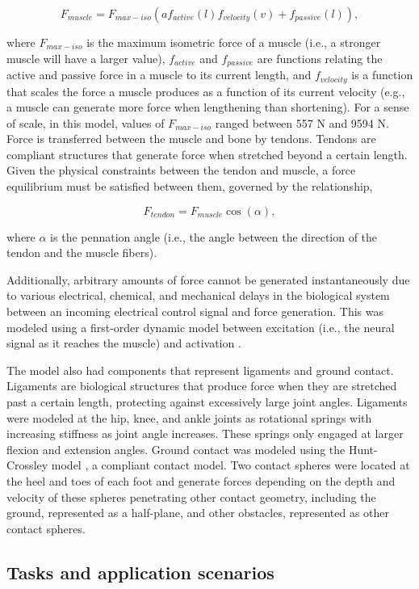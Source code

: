 \documentclass[graybox]{svmult}
\begin{document}
\[F_{muscle} = F_{max-iso}(af_{active}(l)f_{velocity}(v) + f_{passive}(l)),\]

where $F_{max-iso}$ is the maximum isometric force of a muscle (i.e., a stronger muscle will have a larger value), $f_{active}$ and $f_{passive}$ are functions relating the active and passive force in a muscle to its current length, and $f_{velocity}$ is a function that scales the force a muscle produces as a function of its current velocity (e.g., a muscle can generate more force when lengthening than shortening). For a sense of scale, in this model, values of $F_{max-iso}$ ranged between 557 N and 9594 N. Force is transferred between the muscle and bone by tendons. Tendons are compliant structures that generate force when stretched beyond a certain length. Given the physical constraints between the tendon and muscle, a force equilibrium must be satisfied between them, governed by the relationship,

\[F_{tendon} = F_{muscle}\cos(\alpha),\]

where $\alpha$ is the pennation angle (i.e., the angle between the direction of the tendon and the muscle fibers).

Additionally, arbitrary amounts of force cannot be generated instantaneously due to various electrical, chemical, and mechanical delays in the biological system between an incoming electrical control signal and force generation. This was modeled using a first-order dynamic model between excitation (i.e., the neural signal as it reaches the muscle) and activation \cite{thelen2003muscle}.

The model also had components that represent ligaments and ground contact. Ligaments are biological structures that produce force when they are stretched past a certain length, protecting against excessively large joint angles. Ligaments were modeled at the hip, knee, and ankle joints as rotational springs with increasing stiffness as joint angle increases. These springs only engaged at larger flexion and extension angles. Ground contact was modeled using the Hunt-Crossley model \cite{hunt1975contact}, a compliant contact model. Two contact spheres were located at the heel and toes of each foot and generate forces depending on the depth and velocity of these spheres penetrating other contact geometry, including the ground, represented as a half-plane, and other obstacles, represented as other contact spheres. 

\subsection{Tasks and application scenarios}\label{ss:task}
\end{document}
